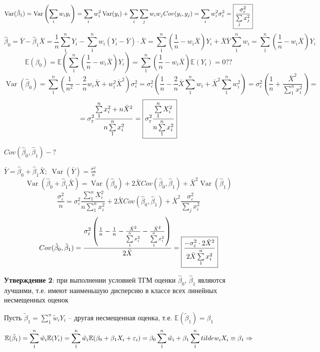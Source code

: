 \documentclass[12pt]{article}
\newcommand{\e}{\mathbb{E}}
\DeclareMathOperator{\var}{Var}
\renewcommand{\epsilon}{\varepsilon}
\newcommand{\msum}{\sum\limits_1^n}
\newcommand{\isum}{\sum\limits_i}
\newcommand{\jsum}{\sum\limits_j}
\begin{document}
$$\var(\hat{\beta}_1) = \var\left(\isum w_i y_i\right) = \isum w_i^2 \var(y_i) + \isum \jsum w_i w_j Cov(y_i, y_j) = \isum w_i^2 \sigma_{\epsilon}^2 = \fbox{\text{$\displaystyle\frac{\sigma_{\epsilon}^2}{\jsum x_j^2}$}}$$
$$\hat{\beta}_0 = \bar{Y} - \hat{\beta}_1 \bar{X} = \frac{1}{n} \msum Y_i - \msum w_i (Y_i - \bar{Y}) \cdot \bar{X} = \msum \left(\frac{1}{n} - w_i \bar{X}\right) Y_i + \bar{X} \bar{Y} \msum w_i = \msum\left(\frac{1}{n} - w_i \bar{X}\right) Y_i$$
$$\e(\beta_0) = \e\left(\msum\left(\frac{1}{n} - w_i \bar{X}\right) Y_i\right) = \msum\left(\frac{1}{n} - w_i \bar{X}\right) \e(Y_i) = 0??$$
$$\var(\hat{\beta}_0) = \msum \left(\frac{1}{n^2} - \frac{2}{n} w_i \bar{X} + w_i^2 \bar{X}^2\right) \sigma_{\epsilon}^2 = \sigma_{\epsilon}^2 \left(\frac{1}{n} - \frac{2}{n} \bar{X} \msum w_i + \bar{X}^2 \msum w_i^2\right) = \sigma_{\epsilon}^2 \left(\frac{1}{n} + \frac{\bar{X}^2}{\msum x_i^2}\right) =$$
$$= \sigma_{\epsilon}^2 \frac{\msum x_i^2 + n \bar{X}^2}{n \msum x_i^2} = \fbox{\text{$\displaystyle\sigma_{\epsilon}^2 \frac{\msum X_i^2}{n \msum x_i^2}$}}$$

$\displaystyle Cov(\hat{\beta}_0, \hat{\beta}_1) - ?$

$\displaystyle\bar{Y} = \hat{\beta}_0 + \hat{\beta}_1 \bar{X}; \; \var(\bar{Y}) = \frac{\sigma_{\epsilon}^2}{n}$
$$\var(\hat{\beta}_0 + \hat{\beta}_1 \bar{X}) = \var(\hat{\beta}_0) + 2 \bar{X} Cov(\hat{\beta}_0, \hat{\beta}_1) + \bar{X}^2 \var(\hat{\beta}_1)$$
$$\frac{\sigma_{\epsilon}^2}{n} = \sigma_{\epsilon}^2 \frac{\msum X_i^2}{n \msum x_i^2} + 2 \bar{X} Cov(\hat{\beta}_0, \hat{\beta}_1) + \bar{X}^2 \frac{\sigma_{\epsilon}^2}{\jsum x_i^2}$$
$$Cov(\hat{\beta}_0, \hat{\beta}_1) = \frac{\sigma_{\epsilon}^2 \left(\frac{1}{n} - \frac{1}{n} -  \frac{\bar{X}^2}{\msum x_i^2} - \frac{\bar{X}^2}{\msum x_i^2}\right)}{2\bar{X}} = \fbox{\text{$\displaystyle\frac{- \sigma_{\epsilon}^2 \cdot 2 \bar{X}^2}{2 \bar{X} \msum x_i^2}$}}$$

\textbf{Утверждение 2}: при выполнении условией ТГМ оценки $\hat{\beta}_0, \, \hat{\beta}_1$ являются лучшими, т.е. имеют наименьшую дисперсию в классе всех линейных несмещенных оценок

Пусть $\tilde{\beta}_1 = \msum \tilde{w}_i Y_i$ -- другая несмещенная оценка, т.е. $\e(\tilde{\beta}_1) = \beta_1$
$$\e(\tilde{\beta}_1) = \msum \tilde{w}_i \e(Y_i) = \msum \tilde{w}_i \e(\beta_0 + \beta_1 X_i + \epsilon_i) = \beta_0 \msum \tilde{w}_i + \beta_1 \msum \\tilde{w}_i X_i \equiv \beta_1 \Rightarrow$$
\end{document}
